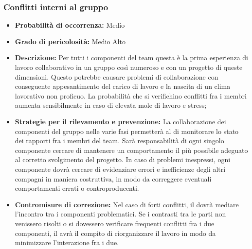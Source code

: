 \subsubsection{Conflitti interni al gruppo}
\hypertarget{subsubsect:conflitti}{}
\begin{itemize}
\item \textbf{Probabilità di occorrenza:} Medio
\item \textbf{Grado di pericolosità:} Medio Alto
\item \textbf{Descrizione:} Per tutti i componenti del team questa è la prima esperienza di lavoro collaborativo in un gruppo così numeroso e con un progetto di queste dimensioni. Questo potrebbe causare problemi di collaborazione con conseguente appesantimento del carico di lavoro e la nascita di un clima lavorativo non proficuo. La probabilità che si verifichino conflitti fra i membri aumenta sensibilmente in caso di elevata mole di lavoro e stress;

\item \textbf{Strategie per il rilevamento e prevenzione:} La collaborazione dei componenti del gruppo nelle varie fasi permetterà al \ruoloResponsabile{} di monitorare lo stato dei rapporti fra i membri del team. Sarà responsabilità di ogni singolo componente cercare di mantenere un comportamento il più possibile adeguato al corretto svolgimento del progetto. In caso di problemi inespressi, ogni componente dovrà cercare di evidenziare errori e inefficienze degli altri compagni in maniera costruttiva, in modo da correggere eventuali comportamenti errati o controproducenti.

\item \textbf{Contromisure di correzione:} Nel caso di forti conflitti, il \ruoloResponsabile{} dovrà mediare l'incontro tra i componenti problematici. Se i contrasti tra le parti non venissero risolti o si dovessero verificare frequenti conflitti fra i due componenti, il \ruoloResponsabile{} avrà il compito di riorganizzare il lavoro in modo da minimizzare l'interazione fra i due.

\end{itemize}

